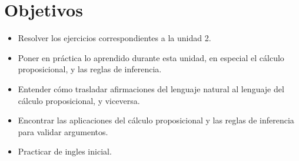 \section*{Objetivos}
	\begin{itemize}
		\item Resolver los ejercicios correspondientes a la unidad 2.
		\item Poner en pr\'actica lo aprendido durante esta unidad, en especial el c\'alculo proposicional, y las reglas de inferencia.
		\item Entender c\'omo trasladar afirmaciones del lenguaje natural al lenguaje del c\'alculo proposicional, y viceversa.
		\item Encontrar las aplicaciones del c\'alculo proposicional y las reglas de inferencia para validar argumentos.
		\item Practicar de ingles inicial.
	\end{itemize}
\newpage
